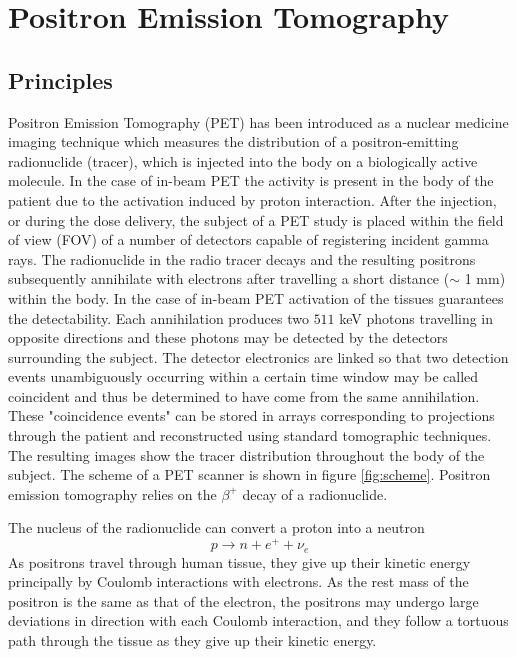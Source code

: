 \section{Positron Emission Tomography}
\subsection{Principles}
Positron Emission Tomography (\ac{PET}) has been introduced as a nuclear medicine imaging technique which measures the distribution of a positron-emitting radionuclide (tracer), which is injected into the body on a biologically active molecule. In the case of in-beam PET the activity is present in the body of the patient due to the activation induced by proton interaction.
After the injection, or during the dose delivery, the subject of a \ac{PET} study is placed within the field of view (\ac{FOV}) of a number of detectors capable of registering incident gamma rays. The radionuclide in the radio tracer decays and the resulting positrons subsequently annihilate with electrons after travelling a short distance ($\sim$ 1 mm) within the body. In the case of in-beam PET activation of the tissues guarantees the detectability. Each annihilation produces two $511$ keV photons travelling in opposite directions and these photons may be detected by the detectors surrounding the subject. The detector electronics are linked so that two detection events unambiguously occurring within a certain time window may be called coincident and thus be determined to have come from the same annihilation. These "coincidence events" can be stored in arrays corresponding to projections through the patient and reconstructed using standard tomographic techniques. The resulting images show the tracer distribution throughout the body of the subject. The scheme of a PET scanner is shown in figure \ref{fig:scheme}.
Positron emission tomography relies on the $\beta ^{+}$ decay of a radionuclide.

The nucleus of the radionuclide can convert a proton into a neutron 
\begin{displaymath}
p\rightarrow n + e^{+} + \nu _{e}
\end{displaymath}
As positrons travel through human tissue, they give up their kinetic energy principally by Coulomb interactions with electrons. As the rest mass of the positron is the same as that of the electron, the positrons may undergo large deviations in direction with each Coulomb interaction, and they follow a tortuous path through the tissue as they give up their kinetic energy.

